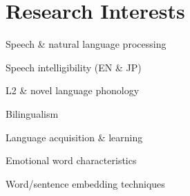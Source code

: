 \documentclass[letterpaper]{deedy-resume} %
\begin{document}

\lastupdated %


\section{Research Interests}
\vspace{\topsep} %
\begin{tightitemize}
\item Speech \& natural language processing 
\item Speech intelligibility (EN \& JP) 
\item L2 \& novel language phonology 
\item Bilingualism 
\item Language acquisition \& learning 
\item Emotional word characteristics
\item Word/sentence embedding techniques
\end{tightitemize}
\sectionspace

\end{document}
